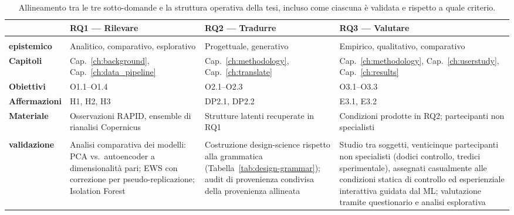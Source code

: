\begin{table}[!ht]
    \centering
    \small
    \setlength{\tabcolsep}{5pt}
    \renewcommand{\arraystretch}{1.25}
    \caption{Allineamento tra le tre sotto-domande e la struttura operativa della tesi, incluso come ciascuna è validata e rispetto a quale criterio.}
    \label{tab:alignment}
    \begin{tabular}{
        @{}
        >{\RaggedRight\arraybackslash}p{2.7cm}
        >{\RaggedRight\arraybackslash}p{3.7cm}
        >{\RaggedRight\arraybackslash}p{3.7cm}
        >{\RaggedRight\arraybackslash}p{3.7cm}
        @{}
    }
        \toprule
        & \textbf{RQ1 --- Rilevare}
        & \textbf{RQ2 --- Tradurre}
        & \textbf{RQ3 --- Valutare} \\
        \midrule
        \makecell[l]{\textbf{Carattere}\\\textbf{epistemico}}
            & Analitico, comparativo, esplorativo
            & Progettuale, generativo
            & Empirico, qualitativo, comparativo \\[0.5em]

        \textbf{Capitoli}
            & Cap.~\ref{ch:background}, Cap.~\ref{ch:data_pipeline}
            & Cap.~\ref{ch:methodology}, Cap.~\ref{ch:translate}
            & Cap.~\ref{ch:methodology}, Cap.~\ref{ch:userstudy}, Cap.~\ref{ch:results} \\[0.5em]

        \textbf{Obiettivi}
            & O1.1--O1.4
            & O2.1--O2.3
            & O3.1--O3.3 \\[0.5em]

        \textbf{Affermazioni}
            & H1, H2, H3
            & DP2.1, DP2.2
            & E3.1, E3.2 \\[0.5em]

        \textbf{Materiale}
            & Osservazioni RAPID, ensemble di rianalisi Copernicus
            & Strutture latenti recuperate in RQ1
            & Condizioni prodotte in RQ2; partecipanti non specialisti \\[0.5em]

        \makecell[l]{\textbf{Metodo di}\\\textbf{validazione}}
            & Analisi comparativa dei modelli: PCA vs.\ autoencoder a dimensionalità pari; EWS con correzione per pseudo-replicazione; Isolation Forest
            & Costruzione design-science rispetto alla grammatica (Tabella~\ref{tab:design-grammar}); audit di provenienza condivisa della provenienza allineata
            & Studio tra soggetti, venticinque partecipanti non specialisti (dodici controllo, tredici sperimentale), assegnati casualmente alle condizioni statica di controllo ed esperienziale interattiva guidata dal ML; valutazione tramite questionario e analisi esplorativa \\[0.5em]


\end{tabular}
\end{table}
